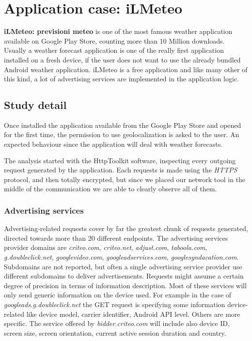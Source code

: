 \section{Application case: iLMeteo}
		\par \textbf{iLMeteo: previsioni meteo} is one of the most famous weather application available on Google Play Store, counting more than 10 Million downloads. Usually a weather forecast application is one of the really first application installed on a fresh device, if the user does not want to use the already bundled Android weather application. iLMeteo is a free application and like many other of this kind, a lot of advertising services are implemented in the application logic. 
		\subsection{Study detail}
			\par Once installed the application available from the Google Play Store and opened for the first time, the permission to use geolocalization is asked to the user. An expected behaviour since the application will deal with weather forecasts. \newline
			\par The analysis started with the HttpToolkit software, inspecting every outgoing request generated by the application. Each requests is made using the \textit{HTTPS} protocol, and then totally encrypted, but since we placed our network tool in the middle of the communication we are able to clearly observe all of them.  
			
			\subsubsection{Advertising services}
				\par Advertising-related requests cover by far the greatest chunk of requests generated, directed towards more than 20 different endpoints. The advertising services provider domains are \textit{criteo.com}, \textit{criteo.net}, \textit{adjust.com}, \textit{taboola.com}, \textit{g.doubleclick.net}, \textit{googlevideo.com}, \textit{googleadservices.com}, \textit{googlesyndacation.com}. Subdomains are not reported, but often a single advertising service provider use different subdomains to deliver advertisements.\newline
				Requests might assume a certain degree of precision in terms of information description. Most of these services will only send generic information on the device used. For example in the case of  \textit{googleads.g.doubleclick.net} the GET request is specifying some information device-related like device model, carrier identifier, Android API level. Others are more specific. The service offered by \textit{bidder.criteo.com} will include also device ID, screen size, screen orientation, current active session duration and country.
				
